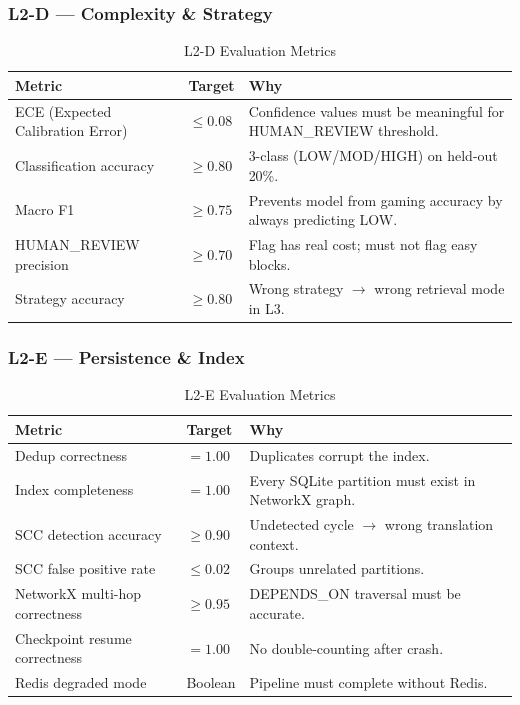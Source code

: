 \documentclass[11pt,a4paper]{article}
\begin{document}
\subsubsection{L2-D — Complexity \& Strategy}

\begin{table}[H]
\centering
\caption{L2-D Evaluation Metrics}
\renewcommand{\arraystretch}{1.25}
\small
\begin{tabularx}{\textwidth}{@{} L{4cm} l X @{}}
\toprule
\textbf{Metric} & \textbf{Target} & \textbf{Why} \\
\midrule
ECE (Expected Calibration Error) & $\leq 0.08$ & Confidence values must be meaningful for HUMAN\_REVIEW threshold. \\
Classification accuracy & $\geq 0.80$ & 3-class (LOW/MOD/HIGH) on held-out 20\%. \\
Macro F1 & $\geq 0.75$ & Prevents model from gaming accuracy by always predicting LOW. \\
HUMAN\_REVIEW precision & $\geq 0.70$ & Flag has real cost; must not flag easy blocks. \\
Strategy accuracy & $\geq 0.80$ & Wrong strategy $\to$ wrong retrieval mode in L3. \\
\bottomrule
\end{tabularx}
\end{table}

\subsubsection{L2-E — Persistence \& Index}

\begin{table}[H]
\centering
\caption{L2-E Evaluation Metrics}
\renewcommand{\arraystretch}{1.25}
\small
\begin{tabularx}{\textwidth}{@{} L{4cm} l X @{}}
\toprule
\textbf{Metric} & \textbf{Target} & \textbf{Why} \\
\midrule
Dedup correctness & $= 1.00$ & Duplicates corrupt the index. \\
Index completeness & $= 1.00$ & Every SQLite partition must exist in NetworkX graph. \\
SCC detection accuracy & $\geq 0.90$ & Undetected cycle $\to$ wrong translation context. \\
SCC false positive rate & $\leq 0.02$ & Groups unrelated partitions. \\
NetworkX multi-hop correctness & $\geq 0.95$ & DEPENDS\_ON traversal must be accurate. \\
Checkpoint resume correctness & $= 1.00$ & No double-counting after crash. \\
Redis degraded mode & Boolean & Pipeline must complete without Redis. \\
\bottomrule
\end{tabularx}
\end{table}
\end{document}
